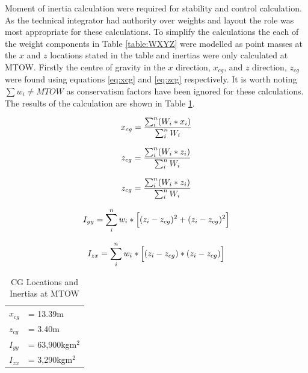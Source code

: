 \documentclass[11pt]{article}
\newcommand{\ra}[1]{\renewcommand{\arraystretch}{#1}}
\begin{document}
Moment of inertia calculation were required for stability and control calculation. As the technical integrator had authority over weights and layout the role was most appropriate for these calculations. To simplify the calculations the each of the weight components in Table \ref{table:WXYZ} were modelled as point masses at the $x$ and $z$ locations stated in the table and inertias were only calculated at MTOW. Firstly the centre of gravity in the $x$ direction, $x_{cg}$, and $z$ direction, $z_{cg}$ were found using equations \ref{eq:xcg} and \ref{eq:zcg} respectively. It is worth noting $\sum w_{i}\neq MTOW$ as conservatism factors have been ignored for these calculations. The results of the calculation are shown in Table \ref{table:inert}.


\begin{equation} \label{eq:xcg}
\centering
x_{cg} = \frac{ \sum_{i}^{n}(W_{i}*x_{i})}{ \sum_{i}^{n} W_{i}}
\end{equation}

\begin{equation} \label{eq:zcg}
\centering
z_{cg} = \frac{ \sum_{i}^{n}(W_{i}*z_{i})}{ \sum_{i}^{n} W_{i}}
\end{equation}


\begin{equation} \label{eq:zcg}
\centering
z_{cg} = \frac{ \sum_{i}^{n}(W_{i}*z_{i})}{ \sum_{i}^{n} W_{i}}
\end{equation}

\begin{equation} \label{eq:iyy}
\centering
I_{yy} =  \sum_{i}^{n}w_{i}*\Big[(z_{i}-z_{cg})^2 + (z_{i}-z_{cg})^2 \Big]
\end{equation}

\begin{equation} \label{eq:izx}
\centering
I_{zx} =  \sum_{i}^{n}w_{i}*\Big[(z_{i}-z_{cg})*(z_{i}-z_{cg})\Big]
\end{equation}

\begin{table}[!h]
\centering %
\ra{1.3}
\begin{tabular}{@{}ll@{}}\toprule
$x_{cg}$ & = 13.39m \\
$z_{cg}$  &= 3.40m  \\ 
$I_{yy}$ &= 63,900kgm$^2$ \\
$I_{zx}$ &= 3,290kgm$^2$\\
\bottomrule
\end{tabular}
\caption{CG Locations and Inertias at MTOW}
\label{table:inert}
\end{table}
\FloatBarrier
\end{document}
